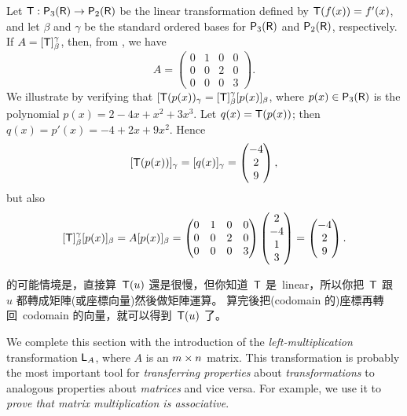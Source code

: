 \begin{example} \label{example 2.3.3}
Let \(\textsf{T}: \textsf{P}_3(\textsf{R}) \to \textsf{P}_2(\textsf{R})\) be the linear transformation defined by \(\textsf{T}(f(x)) = f'(x)\),
and let \(\beta\) and \(\gamma\) be the standard ordered bases for \(\textsf{P}_3(\textsf{R})\) and \(\textsf{P}_2(\textsf{R})\), respectively.
If \(A = [\textsf{T}]_{\beta}^{\gamma}\), then, from , we have
\[
    A = \begin{pmatrix}
        0 & 1 & 0 & 0 \\
        0 & 0 & 2 & 0 \\
        0 & 0 & 0 & 3
    \end{pmatrix}.
\]
We illustrate  by verifying that \([\textsf{T}(p(x))_{\gamma} = [\textsf{T}]_{\beta}^{\gamma}[p(x)]_{\beta}\),
where \(p(x) \in \textsf{P}_3(\textsf{R})\) is the polynomial \(p(x) = 2 - 4x + x^2 + 3x^3\).
Let \(q(x) = \textsf{T}(p(x))\);
then \(q(x) = p'(x) = -4 + 2x + 9x^2\).
Hence
\[
    [\textsf{T}(p(x))]_{\gamma} = [q(x)]_{\gamma} = \begin{pmatrix}
        -4 \\ 2 \\ 9
    \end{pmatrix},
\]
but also
\[
    [\textsf{T}]_{\beta}^{\gamma}[p(x)]_{\beta} = A [p(x)]_{\beta} = \begin{pmatrix}
        0 & 1 & 0 & 0 \\
        0 & 0 & 2 & 0 \\
        0 & 0 & 0 & 3
    \end{pmatrix}
    \begin{pmatrix}
        2 \\ -4 \\ 1 \\ 3
    \end{pmatrix}
    = \begin{pmatrix}
        -4 \\ 2 \\ 9
    \end{pmatrix}.
\]
\end{example}

\begin{note}
 的可能情境是，直接算\ \(\textsf{T}(u)\) 還是很慢，但你知道\ \(\textsf{T}\) 是\ linear，所以你把\ \(\textsf{T}\) 跟\ \(u\) 都轉成矩陣(或座標向量)然後做矩陣運算。
算完後把(codomain 的)座標再轉回\ codomain 的向量，就可以得到\ \(\textsf{T}(u)\) 了。
\end{note}

We complete this section with the introduction of the \emph{left-multiplication} transformation \(\textsf{L}_A\), where \(A\) is an \(m \times n\) matrix.
This transformation is probably the most important tool for \emph{transferring properties} about \emph{transformations} to analogous properties about \emph{matrices} and vice versa.
For example, we use it to \emph{prove that matrix multiplication is associative}.

